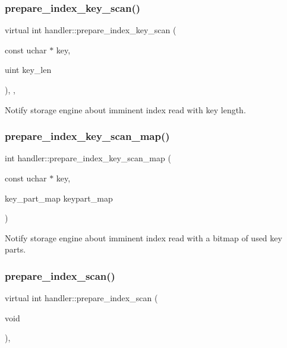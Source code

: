\subsubsection{\texorpdfstring{prepare\+\_\+index\+\_\+key\+\_\+scan()}{prepare\_index\_key\_scan()}}
{\footnotesize\ttfamily virtual int handler\+::prepare\+\_\+index\+\_\+key\+\_\+scan (\begin{DoxyParamCaption}\item[{const uchar $\ast$}]{key,  }\item[{uint}]{key\+\_\+len }\end{DoxyParamCaption})\hspace{0.3cm}{\ttfamily [inline]}, {\ttfamily [protected]}, {\ttfamily [virtual]}}

Notify storage engine about imminent index read with key length. \mbox{\label{classhandler_a4906703169a1e43358e2d95f0d90e911}} 
\subsubsection{\texorpdfstring{prepare\+\_\+index\+\_\+key\+\_\+scan\+\_\+map()}{prepare\_index\_key\_scan\_map()}}
{\footnotesize\ttfamily int handler\+::prepare\+\_\+index\+\_\+key\+\_\+scan\+\_\+map (\begin{DoxyParamCaption}\item[{const uchar $\ast$}]{key,  }\item[{key\+\_\+part\+\_\+map}]{keypart\+\_\+map }\end{DoxyParamCaption})\hspace{0.3cm}{\ttfamily [inline]}}

Notify storage engine about imminent index read with a bitmap of used key parts. \mbox{\label{classhandler_ad17ab5ed40c1eab55ce74ce2465c9bff}} 
\subsubsection{\texorpdfstring{prepare\+\_\+index\+\_\+scan()}{prepare\_index\_scan()}}
{\footnotesize\ttfamily virtual int handler\+::prepare\+\_\+index\+\_\+scan (\begin{DoxyParamCaption}\item[{void}]{ }\end{DoxyParamCaption})\hspace{0.3cm}{\ttfamily [inline]}, {\ttfamily [virtual]}}

